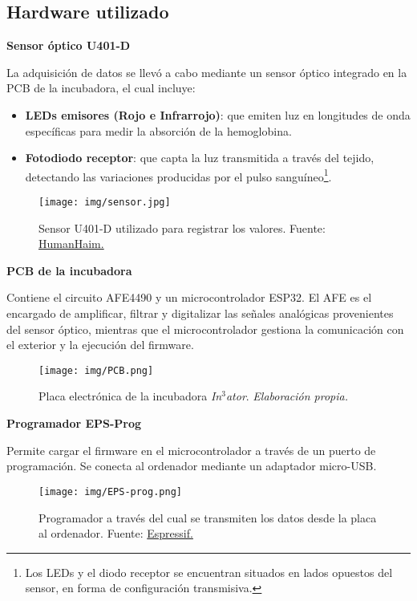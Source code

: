 \subsection{Hardware utilizado}
\label{TecnicasyHerramientas}
\textbf{Sensor óptico U401-D}

La adquisición de datos se llevó a cabo mediante un sensor óptico integrado en la PCB de la incubadora, el cual incluye:

\begin{itemize}
    \item \textbf{LEDs emisores (Rojo e Infrarrojo)}: que emiten luz en longitudes de onda específicas para medir la absorción de la hemoglobina.
    \item \textbf{Fotodiodo receptor}: que capta la luz transmitida a través del tejido, detectando las variaciones producidas por el pulso sanguíneo\footnote{Los LEDs y el diodo receptor se encuentran situados en lados opuestos del sensor, en forma de configuración transmisiva.}.
\end{itemize}

\begin{figure}[H]
    \centering
    \texttt{[image: img/sensor.jpg]}
    \caption{Sensor U401-D utilizado para registrar los valores. Fuente: \href{https://www.humanhaim.com/product/sensor-de-oximetria-neo-sp02-7pin-u401-d01as-f/}{HumanHaim.}}
    \label{fig:sensor}
\end{figure}

\newpage

\textbf{PCB de la incubadora}

Contiene el circuito AFE4490 y un microcontrolador ESP32. El AFE es el encargado de amplificar, filtrar y digitalizar las señales analógicas provenientes del sensor óptico, mientras que el microcontrolador gestiona la comunicación con el exterior y la ejecución del firmware.

\begin{figure}[H]
    \centering
    \texttt{[image: img/PCB.png]}
    \caption{Placa electrónica de la incubadora \textit{In$^3$ator}. \textit{Elaboración propia.}}
    \label{fig:PCB}
\end{figure}

    
\textbf{Programador EPS-Prog}

Permite cargar el firmware en el microcontrolador a través de un puerto de programación. Se conecta al ordenador mediante un adaptador micro-USB.

\begin{figure}[H]
    \centering
    \texttt{[image: img/EPS-prog.png]}
    \caption{Programador a través del cual se transmiten los datos desde la placa al ordenador. Fuente: \href{https://docs.espressif.com/projects/esp-dev-kits/en/latest/other/esp-prog/user_guide.html}{Espressif.}}
    \label{fig:EPS-prog}
\end{figure}

